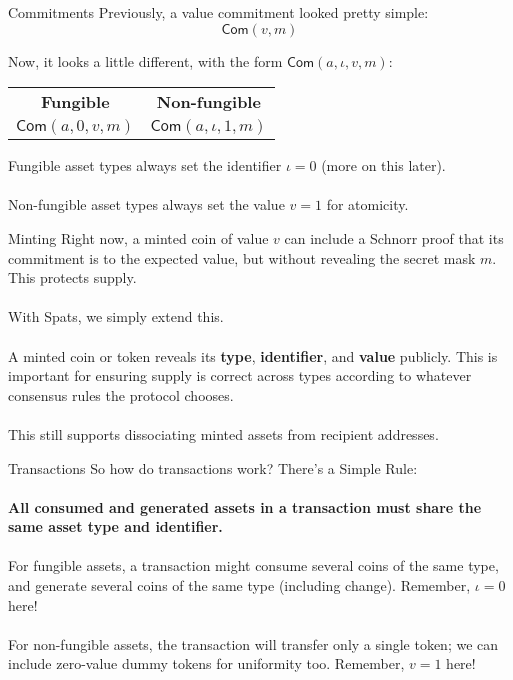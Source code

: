 \documentclass[aspectratio=169]{beamer}
\newcommand{\com}{\mathsf{Com}}
\begin{document}
\begin{frame}{Commitments}
	Previously, a value commitment looked pretty simple:
	$$\com(v, m)$$

	Now, it looks a little different, with the form $\com(a, \iota, v, m)$:

	\begin{center}
		\setlength{\tabcolsep}{20pt}
		\renewcommand{\arraystretch}{1.5}
		\begin{tabular}{cc}
			\textbf{Fungible} & \textbf{Non-fungible} \\
			$\com(a, 0, v, m)$ & $\com(a, \iota, 1, m)$
		\end{tabular}
	\end{center}

	Fungible asset types always set the identifier $\iota = 0$ (more on this later). \\~\\

	Non-fungible asset types always set the value $v = 1$ for atomicity.
\end{frame}

\begin{frame}{Minting}
	Right now, a minted coin of value $v$ can include a Schnorr proof that its commitment is to the expected value, but without revealing the secret mask $m$.
	This protects supply. \\~\\

	With Spats, we simply extend this. \\~\\

	A minted coin or token reveals its \textbf{type}, \textbf{identifier}, and \textbf{value} publicly.
	This is important for ensuring supply is correct across types according to whatever consensus rules the protocol chooses. \\~\\

	This still supports dissociating minted assets from recipient addresses.
\end{frame}

\begin{frame}{Transactions}
	So how do transactions work? There's a Simple Rule: \\~\\

	\textbf{All consumed and generated assets in a transaction must share the same asset type and identifier.} \\~\\

	For fungible assets, a transaction might consume several coins of the same type, and generate several coins of the same type (including change).
	Remember, $\iota = 0$ here! \\~\\

	For non-fungible assets, the transaction will transfer only a single token; we can include zero-value dummy tokens for uniformity too.
	Remember, $v = 1$ here!
\end{frame}
\end{document}
